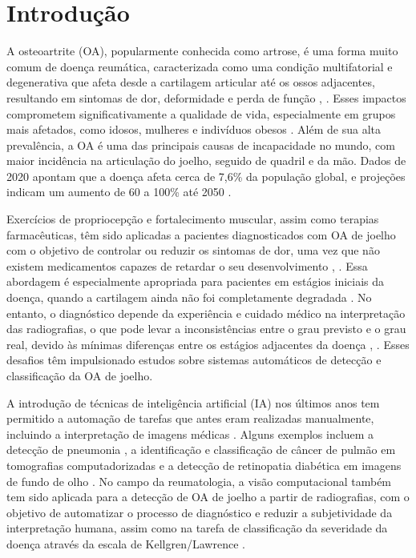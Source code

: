 
\chapter[Introdução]{Introdução}

A osteoartrite (OA), popularmente conhecida como artrose, é uma forma muito comum de doença reumática, caracterizada como uma condição multifatorial e degenerativa que afeta desde a cartilagem articular até os ossos adjacentes, resultando em sintomas de dor, deformidade e perda de função \cite{Kraus2015}, \cite{PACCA2018}. Esses impactos comprometem significativamente a qualidade de vida, especialmente em grupos mais afetados, como idosos, mulheres e indivíduos obesos \cite{PACCA2018}. Além de sua alta prevalência, a OA é uma das principais causas de incapacidade no mundo, com maior incidência na articulação do joelho, seguido de quadril e da mão. Dados de 2020 apontam que a doença afeta cerca de 7,6\% da população global, e projeções indicam um aumento de 60 a 100\% até 2050 \cite{COURTIES20241397}.

Exercícios de propriocepção e fortalecimento muscular, assim como terapias farmacêuticas, têm sido aplicadas a pacientes diagnosticados com OA de joelho com o objetivo de controlar ou reduzir os sintomas de dor, uma vez que não existem medicamentos capazes de retardar o seu desenvolvimento \cite{Sardim2020}, \cite{Lin2009}. Essa abordagem é especialmente apropriada para pacientes em estágios iniciais da doença, quando a cartilagem ainda não foi completamente degradada \cite{Kanamoto2020}. No entanto, o diagnóstico depende da experiência e cuidado médico na interpretação das radiografias, o que pode levar a inconsistências entre o grau previsto e o grau real, devido às mínimas diferenças entre os estágios adjacentes da doença \cite{KELLGREN1957}, \cite{Mohammed2023}. Esses desafios têm impulsionado estudos sobre sistemas automáticos de detecção e classificação da OA de joelho.

A introdução de técnicas de inteligência artificial (IA) nos últimos anos tem permitido a automação de tarefas que antes eram realizadas manualmente, incluindo a interpretação de imagens médicas \cite{WANG2024103201}. Alguns exemplos incluem a detecção de pneumonia \cite{9077899}, a identificação e classificação de câncer de pulmão em tomografias computadorizadas \cite{8697352} e a detecção de retinopatia diabética em imagens de fundo de olho \cite{Dai2021}. No campo da reumatologia, a visão computacional também tem sido aplicada para a detecção de OA de joelho a partir de radiografias, com o objetivo de automatizar o processo de diagnóstico e reduzir a subjetividade da interpretação humana, assim como na tarefa de classificação da severidade da doença através da escala de Kellgren/Lawrence \cite{Mohammed2023}.

